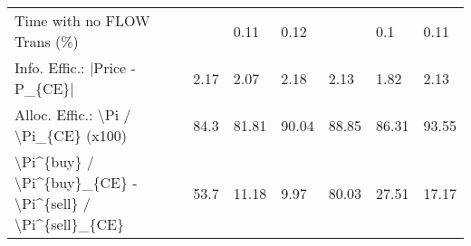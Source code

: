 \begin{tabular}{lllllll}
 Time with no FLOW Trans (\%)                               &          & 0.11     & 0.12     &           & 0.1       & 0.11      \\
 Info. Effic.: |Price - P\_\{CE\}|                            & 2.17     & 2.07     & 2.18     & 2.13      & 1.82      & 2.13      \\
 Alloc. Effic.: \textbackslash{}Pi / \textbackslash{}Pi\_\{CE\} (x100)                      & 84.3     & 81.81    & 90.04    & 88.85     & 86.31     & 93.55     \\
 \textbackslash{}Pi\^{}\{buy\} / \textbackslash{}Pi\^{}\{buy\}\_\{CE\} - \textbackslash{}Pi\^{}\{sell\} / \textbackslash{}Pi\^{}\{sell\}\_\{CE\} & 53.7     & 11.18    & 9.97     & 80.03     & 27.51     & 17.17     \\
\hline
\end{tabular}